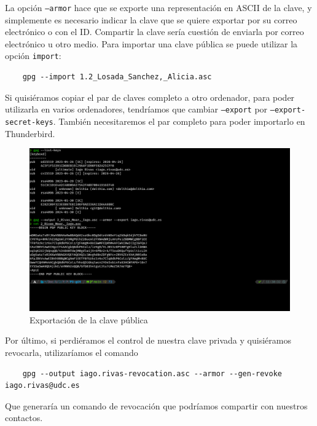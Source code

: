 La opción \texttt{--armor} hace que se exporte una representación en ASCII de la clave, y simplemente es necesario indicar la clave que se quiere exportar por su correo electrónico o con el ID. Compartir la clave sería cuestión de enviarla por correo electrónico u otro medio. Para importar una clave pública se puede utilizar la opción \texttt{import}:

\begin{verbatim}
    gpg --import 1.2_Losada_Sanchez,_Alicia.asc
\end{verbatim}

Si quisiéramos copiar el par de claves completo a otro ordenador, para poder utilizarla en varios ordenadores, tendríamos que cambiar \texttt{--export} por \texttt{--export-secret-keys}. También necesitaremos el par completo para poder importarlo en Thunderbird.

\begin{figure}[H]
    \centering
    \includegraphics[width=\textwidth]{gpg-export.png}
    \caption{Exportación de la clave pública}
\end{figure}

Por último, si perdiéramos el control de nuestra clave privada y quisiéramos revocarla, utilizaríamos el comando

\begin{verbatim}
    gpg --output iago.rivas-revocation.asc --armor --gen-revoke iago.rivas@udc.es
\end{verbatim}

Que generaría un comando de revocación que podríamos compartir con nuestros contactos.
